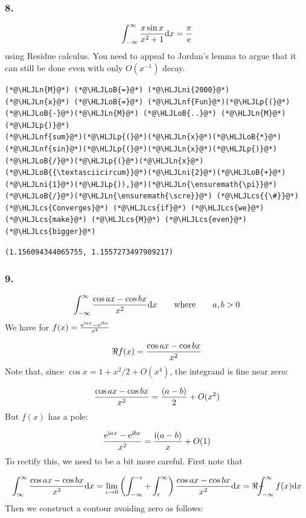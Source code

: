 \documentclass[12pt,a4paper]{article}
\newcommand{\HLJLn}[1]{#1}
\newcommand{\HLJLnf}[1]{\textcolor[RGB]{66,102,213}{#1}}
\newcommand{\HLJLni}[1]{\textcolor[RGB]{59,151,46}{#1}}
\newcommand{\HLJLoB}[1]{\textcolor[RGB]{102,102,102}{\textbf{#1}}}
\newcommand{\HLJLp}[1]{#1}
\newcommand{\HLJLcs}[1]{\textcolor[RGB]{153,153,119}{\textit{#1}}}
\def\D{ {\rm d} }
\def\I{ {\rm i} }
\def\E{ {\rm e} }
\def\qqwhere{\qquad\hbox{where}\qquad}
\def\Xint#1{ \mathchoice
   {\XXint\displaystyle\textstyle{#1} }%
   {\XXint\textstyle\scriptstyle{#1} }%
   {\XXint\scriptstyle\scriptscriptstyle{#1} }%
   {\XXint\scriptscriptstyle\scriptscriptstyle{#1} }%
   \!\int}
\def\XXint#1#2#3{ {\setbox0=\hbox{$#1{#2#3}{\int}$}
     \vcenter{\hbox{$#2#3$}}\kern-.5\wd0} }
\def\dashint{\Xint-}
\def\dx{\D x}
\def\scre{\E}
\begin{document}
\subsubsection{8.}
\[
	\int_{-\infty}^\infty    {x \sin x \over x^2 + 1} \dx = { \pi \over \E}
\]
using Residue calculus. You need to appeal to Jordan's lemma to argue that it can still be done even with only $O(x^{-1})$ decay.


\begin{lstlisting}
(*@\HLJLn{M}@*) (*@\HLJLoB{=}@*) (*@\HLJLni{2000}@*)
(*@\HLJLn{x}@*) (*@\HLJLoB{=}@*) (*@\HLJLnf{Fun}@*)(*@\HLJLp{(}@*)(*@\HLJLoB{-}@*)(*@\HLJLn{M}@*) (*@\HLJLoB{..}@*) (*@\HLJLn{M}@*)(*@\HLJLp{)}@*)
(*@\HLJLnf{sum}@*)(*@\HLJLp{(}@*)(*@\HLJLn{x}@*)(*@\HLJLoB{*}@*)(*@\HLJLnf{sin}@*)(*@\HLJLp{(}@*)(*@\HLJLn{x}@*)(*@\HLJLp{)}@*)(*@\HLJLoB{/}@*)(*@\HLJLp{(}@*)(*@\HLJLn{x}@*)(*@\HLJLoB{{\textasciicircum}}@*)(*@\HLJLni{2}@*)(*@\HLJLoB{+}@*)(*@\HLJLni{1}@*)(*@\HLJLp{)),}@*)(*@\HLJLn{\ensuremath{\pi}}@*)(*@\HLJLoB{/}@*)(*@\HLJLn{\ensuremath{\scre}}@*) (*@\HLJLcs{{\#}}@*) (*@\HLJLcs{Converges}@*) (*@\HLJLcs{if}@*) (*@\HLJLcs{we}@*) (*@\HLJLcs{make}@*) (*@\HLJLcs{M}@*) (*@\HLJLcs{even}@*) (*@\HLJLcs{bigger}@*)
\end{lstlisting}

\begin{lstlisting}
(1.156094344065755, 1.1557273497909217)
\end{lstlisting}


\subsubsection{9.}
\[
\int_{-\infty}^\infty {\cos a x - \cos b x \over x^2}  \dx \qqwhere a,b > 0
\]
We have for $f(x) = {\E^{\I a x} - \E^{\I b x} \over x^2}$

\[
\Re f(x) = {\cos a x - \cos b x \over x^2}
\]
Note that, since $\cos x = 1 + x^2/2 + O(x^4)$, the integrand is fine near zero:

\[
{\cos a x - \cos b x \over x^2} = {(a -b)  \over 2} + O(x^2)
\]
But $f(x)$ has a pole:

\[
     {\E^{\I a x} - \E^{\I b x} \over x^2}  = {\I (a-b) \over x} + O(1)
\]
To rectify this, we need to be a bit more careful. First note that

\[
\int_{\infty}^\infty {\cos a x - \cos b x \over x^2} \dx = \lim_{\epsilon \rightarrow 0} \left(\int_{-\infty}^{-\epsilon} + \int_\epsilon^\infty \right){\cos a x - \cos b x \over x^2} \dx = \Re \dashint_{-\infty}^\infty f(x) \dx
\]
Then we construct a contour avoiding zero as follows:
\end{document}
